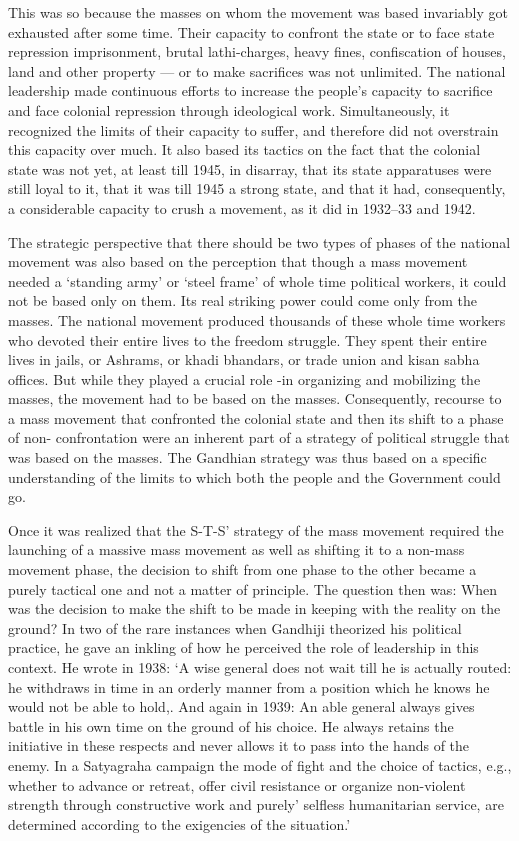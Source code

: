 \begin{multicols}{2}
This was so because the masses on whom the movement was based invariably got exhausted after some time. Their capacity to confront the state or to face state repression imprisonment, brutal lathi-charges, heavy fines, confiscation of houses, land and other property --- or to make sacrifices was not unlimited. The national leadership made continuous efforts to increase the people's capacity to sacrifice and face colonial repression through ideological work. Simultaneously, it recognized the limits of their capacity to suffer, and therefore did not overstrain this capacity over much. It also based its tactics on the fact that the colonial state was not yet, at least till 1945, in disarray, that its state apparatuses were still loyal to it, that it was till 1945 a strong state, and that it had, consequently, a considerable capacity to crush a movement, as it did in 1932--33 and 1942.

The strategic perspective that there should be two types of phases of the national movement was also based on the perception that though a mass movement needed a `standing army' or `steel frame' of whole time political workers, it could not be based only on them. Its real striking power could come only from the masses. The national movement produced thousands of these whole time workers who devoted their entire lives to the freedom struggle. They spent their entire lives in jails, or Ashrams, or khadi bhandars, or trade union and kisan sabha offices. But while they played a crucial role -in organizing and mobilizing the masses, the movement had to be based on the masses. Consequently, recourse to a mass movement that confronted the colonial state and then its shift to a phase of non- confrontation were an inherent part of a strategy of political struggle that was based on the masses. The Gandhian strategy was thus based on a specific understanding of the limits to which both the people and the Government could go.

Once it was realized that the S-T-S' strategy of the mass movement required the launching of a massive mass movement as well as shifting it to a non-mass movement phase, the decision to shift from one phase to the other became a purely tactical one and not a matter of principle. The question then was: When was the decision to make the shift to be made in keeping with the reality on the ground? In two of the rare instances when Gandhiji theorized his political practice, he gave an inkling of how he perceived the role of leadership in this context. He wrote in 1938: `A wise general does not wait till he is actually routed: he withdraws in time in an orderly manner from a position which he knows he would not be able to hold,. And again in 1939: An able general always gives battle in his own time on the ground of his choice. He always retains the initiative in these respects and never allows it to pass into the hands of the enemy. In a Satyagraha campaign the mode of fight and the choice of tactics, e.g., whether to advance or retreat, offer civil resistance or organize non-violent strength through constructive work and purely' selfless humanitarian service, are determined according to the exigencies of the situation.'


\end{multicols}
